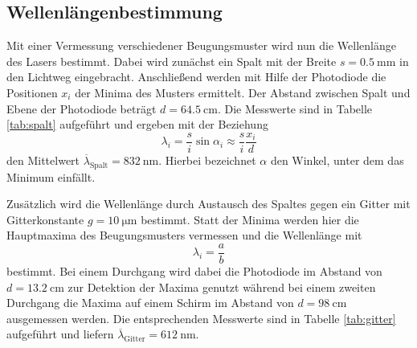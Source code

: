 \subsection{Wellenlängenbestimmung}
\label{subsec:wellenlänge}
Mit einer Vermessung verschiedener Beugungsmuster wird nun die Wellenlänge des
Lasers bestimmt.
Dabei wird zunächst ein Spalt mit der Breite $s = \SI{0.5}{\milli\meter}$ in den Lichtweg eingebracht.
Anschließend werden mit Hilfe der Photodiode die Positionen $x_i$ der Minima des Musters ermittelt.
Der Abstand zwischen Spalt und Ebene der Photodiode beträgt $d = \SI{64.5}{\centi\meter}$.
Die Messwerte sind in Tabelle \ref{tab:spalt} aufgeführt und ergeben mit der Beziehung
\begin{equation}
    \label{eq:spalt}
    \lambda_i = \frac{s}{i}\sin\alpha_i \approx \frac{s}{i}\frac{x_i}{d}
\end{equation}
den Mittelwert $\overline{\lambda}_\text{Spalt} = \SI{832}{\nano\meter}$.
Hierbei bezeichnet $\alpha$ den Winkel, unter dem das Minimum einfällt.

Zusätzlich wird die Wellenlänge durch Austausch des Spaltes gegen ein Gitter mit Gitterkonstante $g = \SI{10}{\micro\meter}$ bestimmt.
Statt der Minima werden hier die Hauptmaxima des Beugungsmusters vermessen und die Wellenlänge mit
\begin{equation}
\label{eq:gitter}
    \lambda_i = \frac{a}{b}
\end{equation}
bestimmt.
Bei einem Durchgang wird dabei die Photodiode im Abstand von $d = \SI{13.2}{\centi\meter}$ zur Detektion der Maxima genutzt während bei einem zweiten Durchgang die Maxima auf einem Schirm im Abstand von $d = \SI{98}{\centi\meter}$ ausgemessen werden.
Die entsprechenden Messwerte sind in Tabelle \ref{tab:gitter} aufgeführt und liefern $\overline{\lambda}_\text{Gitter} = \SI{612}{\nano\meter}$.
